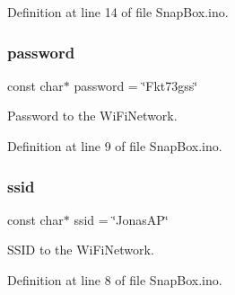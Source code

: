 Definition at line 14 of file Snap\+Box.\+ino.

\mbox{\label{_snap_box_8ino_aa4a2ebcb494493f648ae1e6975672575}} 
\subsubsection{\texorpdfstring{password}{password}}
{\footnotesize\ttfamily const char$\ast$ password = \char`\"{}Fkt73gss\char`\"{}}



Password to the Wi\+Fi\+Network. 



Definition at line 9 of file Snap\+Box.\+ino.

\mbox{\label{_snap_box_8ino_a587ba0cb07f02913598610049a3bbb79}} 
\subsubsection{\texorpdfstring{ssid}{ssid}}
{\footnotesize\ttfamily const char$\ast$ ssid = \char`\"{}Jonas\+AP\char`\"{}}



S\+S\+ID to the Wi\+Fi\+Network. 



Definition at line 8 of file Snap\+Box.\+ino.

